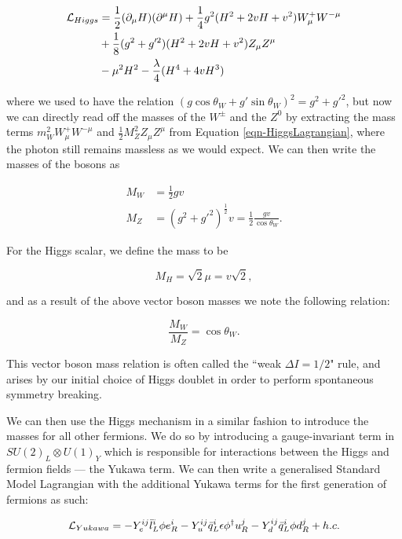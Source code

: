 \begin{equation} \label{eqn-HiggsLagrangian}
\begin{split}
\mathcal{L}_{Higgs} & = \frac{1}{2}(\partial_{\mu}H)(\partial^{\mu}H) + \frac{1}{4}g^2 (H^2 + 2vH + v^2) W^+_{\mu} W^{-\mu} \\
& + \frac{1}{8} (g^2 + g'^2) (H^2 + 2vH + v^2) Z_{\mu} Z^{\mu} \\
& - \mu^2 H^2 - \frac{\lambda}{4} (H^4 + 4vH^3)
\end{split}
\end{equation}

where we used to have the relation $(g\cos\theta_W + g'\sin\theta_W)^2 = g^2 + g'^2$, but now we can directly read off the masses of the $W^{\pm}$ and the $Z^0$ by extracting the mass terms $m^2_W W^+_{\mu}W^{-\mu}$ and $\frac{1}{2}M^2_Z Z_{\mu} Z^{\mu}$ from Equation \ref{eqn-HiggsLagrangian}, where the photon still remains massless as we would expect. We can then write the masses of the bosons as 

\begin{align}
M_W & = \frac{1}{2}gv \\
M_Z & = (g^2 + g'^2)^{\frac{1}{2}}v = \frac{1}{2} \frac{gv}{\cos\theta_W}.
\end{align}
 
For the Higgs scalar, we define the mass to be 

\begin{equation}
M_H = \sqrt{2}\mu = v\sqrt{2},
\end{equation}

and as a result of the above vector boson masses we note the following relation:

\begin{equation}
\frac{M_W}{M_Z} = \cos\theta_W.
\end{equation}

This vector boson mass relation is often called the ``weak $\Delta I = 1/2$" rule, and arises by our initial choice of Higgs doublet in order to perform spontaneous symmetry breaking.

We can then use the Higgs mechanism in a similar fashion to introduce the masses for all other fermions. We do so by introducing a gauge-invariant term in $SU(2)_L \otimes U(1)_Y$ which is responsible for interactions between the Higgs and fermion fields --- the Yukawa term. We can then write a generalised Standard Model Lagrangian with the additional Yukawa terms for the first generation of fermions as such: 

\begin{equation}
\mathcal{L}_{Yukawa} = -Y^{ij}_e \bar{l}^i_L \phi e^i_R - Y^{ij}_u \bar{q}^i_L \epsilon \phi^{\dagger} u^j_R - Y^{ij}_d \bar{q}^i_L \phi d^j_R + h.c.
\end{equation}

